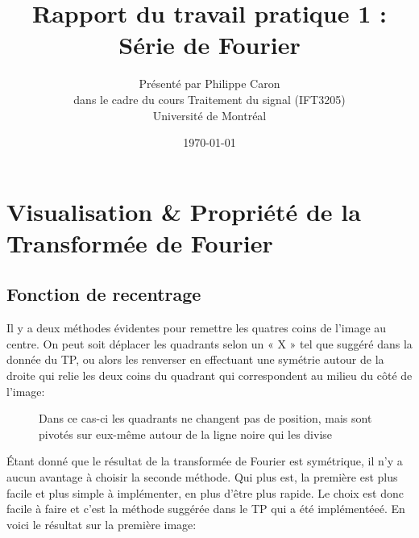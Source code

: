 \documentclass[12pt]{article}
\title{Rapport du travail pratique 1 : Série de Fourier}
\date{\today}
\author{Présenté par Philippe Caron\\dans le cadre du cours Traitement du signal (IFT3205)\\Université de Montréal}
\begin{document}
\begin{titlepage}
  \maketitle
  \thispagestyle{empty}
\end{titlepage}

\section{Visualisation \& Propriété de la Transformée de Fourier}
\setcounter{subsection}{1}
\subsection{Fonction de recentrage}
Il y a deux méthodes évidentes pour remettre les quatres coins de l'image au centre. On peut soit déplacer les quadrants selon un « X » tel que suggéré dans la donnée du TP, ou alors les renverser en effectuant une symétrie autour de la droite qui relie les deux coins du quadrant qui correspondent au milieu du côté de l'image:

\begin{figure}[ht]
  \centering
  \captionsetup{width=.8\linewidth}
  \caption[width = 8cm]{Dans ce cas-ci les quadrants ne changent pas de position, mais sont pivotés sur eux-même autour de la ligne noire qui les divise}
\end{figure}

Étant donné que le résultat de la transformée de Fourier est symétrique, il n'y a aucun avantage à choisir la seconde méthode. Qui plus est, la première est plus facile et plus simple à implémenter, en plus d'être plus rapide. Le choix est donc facile à faire et c'est la méthode suggérée dans le TP qui a été implémentéeé. En voici le résultat sur la première image:
\end{document}

